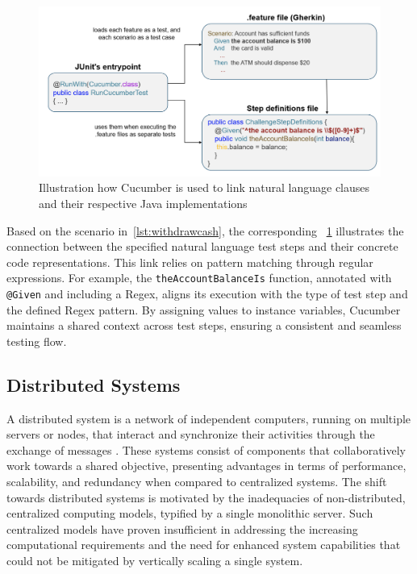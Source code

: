\begin{figure}
    \centering
    \includegraphics[width=\linewidth]{files/figures/cucumber_test_step_mapping.png}
    \caption{Illustration how Cucumber is used to link natural language clauses and their respective Java implementations}
    \label{fig:cucumber-mapping}
\end{figure}

Based on the scenario in~\cref{lst:withdrawcash}, the corresponding ~\cref{fig:cucumber-mapping} illustrates the connection between the specified natural language test steps and their concrete code representations. This link relies on pattern matching through regular expressions. For example, the \texttt{theAccountBalanceIs} function, annotated with \texttt{@Given} and including a \ac{Regex}, aligns its execution with the type of test step and the defined \ac{Regex} pattern. By assigning values to instance variables, Cucumber maintains a shared context across test steps, ensuring a consistent and seamless testing flow.~\cite{noauthor_bdd_nodate}

\subsection{Distributed Systems}
\label{subsec:dissys}
A distributed system is a network of independent computers, running on multiple servers or nodes, that interact and synchronize their activities through the exchange of messages \cite{tanenbaum2007distributed}. These systems consist of components that collaboratively work towards a shared objective, presenting advantages in terms of performance, scalability, and redundancy when compared to centralized systems. The shift towards distributed systems is motivated by the inadequacies of non-distributed, centralized computing models, typified by a single monolithic server. Such centralized models have proven insufficient in addressing the increasing computational requirements and the need for enhanced system capabilities that could not be mitigated by vertically scaling a single system.

